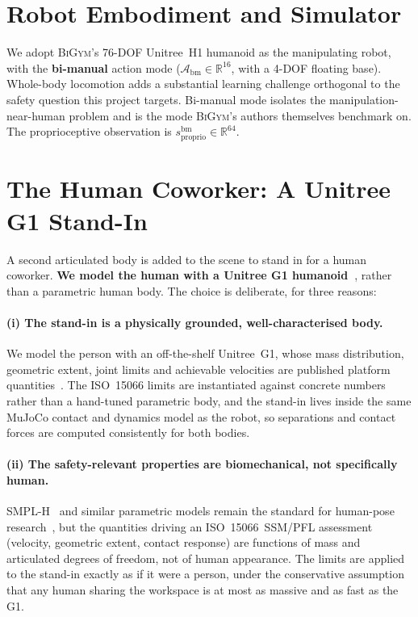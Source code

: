 \documentclass[11pt,a4paper]{report}
\newcommand{\ssm}{SSM}
\newcommand{\pfl}{PFL}
\newcommand{\iso}{ISO~15066}
\newcommand{\bigym}{\textsc{BiGym}}
\begin{document}
\section{Robot Embodiment and Simulator}
\label{sec:bench:embodiment}

We adopt \bigym{}'s 76-DOF Unitree~H1 humanoid as the manipulating
robot, with the \textbf{bi-manual} action mode ($\mathcal{A}_{\mathrm{bm}}
\in \mathbb{R}^{16}$, with a 4-DOF floating base). Whole-body
locomotion adds a substantial learning challenge orthogonal to the
safety question this project targets. Bi-manual mode isolates the
manipulation-near-human problem and is the mode \bigym{}'s authors
themselves benchmark on. The proprioceptive observation is
$s_{\mathrm{proprio}}^{\mathrm{bm}} \in \mathbb{R}^{64}$.

\section{The Human Coworker: A Unitree G1 Stand-In}
\label{sec:bench:human}

A second articulated body is added to the scene to stand in for a
human coworker. \textbf{We model the human with a Unitree G1
humanoid~\cite{unitree_g1}}, rather than a parametric human body.
The choice is deliberate, for three reasons:

\paragraph{(i) The stand-in is a physically grounded, well-characterised body.}
We model the person with an off-the-shelf Unitree~G1, whose mass
distribution, geometric extent, joint limits and achievable
velocities are published platform quantities~\cite{unitree_g1}. The
\iso{} limits are instantiated against concrete numbers rather than
a hand-tuned parametric body, and the stand-in lives inside the same
MuJoCo contact and dynamics model as the robot, so separations and
contact forces are computed consistently for both bodies.

\paragraph{(ii) The safety-relevant properties are biomechanical, not specifically human.}
SMPL-H~\cite{romero2017smplh} and similar parametric models remain
the standard for human-pose research~\cite{tian2023meshsurvey}, but
the quantities driving an
\iso{}~\ssm{}/\pfl{} assessment (velocity, geometric extent, contact
response) are functions of mass and articulated degrees of freedom,
not of human appearance. The limits are applied to the stand-in
exactly as if it were a person, under the conservative assumption
that any human sharing the workspace is at most as massive and as
fast as the G1.
\end{document}

